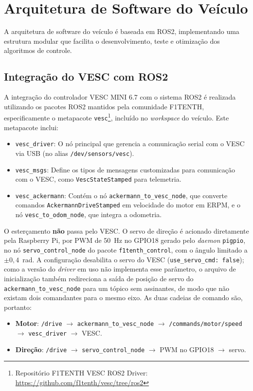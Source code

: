 \section{Arquitetura de Software do Veículo}

A arquitetura de software do veículo é baseada em ROS2, implementando uma
estrutura modular que facilita o desenvolvimento, teste e otimização dos
algoritmos de controle.

\subsection{Integração do VESC com ROS2}

A integração do controlador VESC MINI 6.7 com o sistema ROS2 é realizada
utilizando os pacotes ROS2 mantidos pela comunidade F1TENTH, especificamente o
metapacote \texttt{vesc}\footnote{Repositório F1TENTH VESC ROS2 Driver:
      \url{https://github.com/f1tenth/vesc/tree/ros2}}\cite{F1TENTHVESC},
incluído no \textit{workspace} do veículo. Este metapacote inclui:
\begin{itemize}
      \item \texttt{vesc\_driver}: O nó principal que gerencia a comunicação serial com o
            VESC via USB (no alias \texttt{/dev/sensors/vesc}).
      \item \texttt{vesc\_msgs}: Define os tipos de mensagens customizadas para
            comunicação com o VESC, como \texttt{VescStateStamped} para telemetria.
      \item \texttt{vesc\_ackermann}: Contém o nó \texttt{ackermann\_to\_vesc\_node},
            que converte comandos \texttt{AckermannDriveStamped} em velocidade do
            motor em ERPM, e o nó \texttt{vesc\_to\_odom\_node}, que integra a
            odometria.
\end{itemize}

O esterçamento \textbf{não} passa pelo VESC. O servo de direção é acionado
diretamente pela Raspberry Pi, por PWM de 50~Hz no GPIO18 gerado pelo
\textit{daemon} \texttt{pigpio}, no nó \texttt{servo\_control\_node} do pacote
\texttt{f1tenth\_control}, com o ângulo limitado a $\pm 0{,}4$~rad. A
configuração desabilita o servo do VESC (\texttt{use\_servo\_cmd: false}); como
a versão do \textit{driver} em uso não implementa esse parâmetro, o arquivo de
inicialização também redireciona a saída de posição de servo do
\texttt{ackermann\_to\_vesc\_node} para um tópico sem assinantes, de modo que
não existam dois comandantes para o mesmo eixo. As duas cadeias de comando são,
portanto:
\begin{itemize}
      \item \textbf{Motor}: \texttt{/drive} $\rightarrow$
            \texttt{ackermann\_to\_vesc\_node} $\rightarrow$
            \texttt{/commands/motor/speed} $\rightarrow$ \texttt{vesc\_driver}
            $\rightarrow$ VESC.
      \item \textbf{Direção}: \texttt{/drive} $\rightarrow$
            \texttt{servo\_control\_node} $\rightarrow$ PWM no GPIO18
            $\rightarrow$ servo.
\end{itemize}

